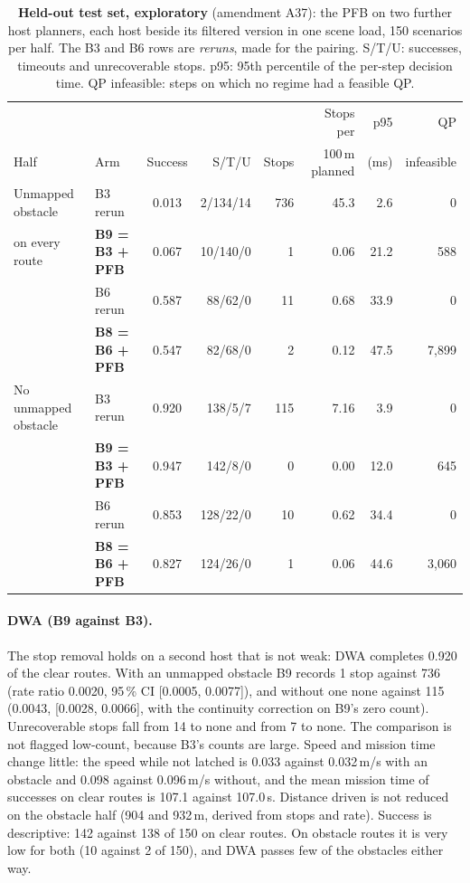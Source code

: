 \documentclass[11pt]{article}
\theoremstyle{definition}
\begin{document}
\begin{table}[!htbp]
\centering
\caption{\textbf{Held-out test set, exploratory} (amendment A37): the PFB on two further host planners, each host beside its
filtered version in one scene load, 150 scenarios per half. The B3 and B6 rows are \emph{reruns}, made for the pairing. S/T/U:
successes, timeouts and unrecoverable stops. p95: 95th percentile of the per-step decision time. QP infeasible: steps on
which no regime had a feasible QP.}
\label{tab:hosts}
\footnotesize
\setlength{\tabcolsep}{4pt}
\begin{tabular}{llcrrrrr}
\toprule
& & & & & Stops per & p95 & QP\\
Half & Arm & Success & S/T/U & Stops & 100\,m planned & (ms) & infeasible\\
\midrule
Unmapped obstacle & B3 rerun & 0.013 & 2/134/14 & 736 & 45.3 & 2.6 & 0\\
on every route & \textbf{B9 = B3 + PFB} & 0.067 & 10/140/0 & 1 & 0.06 & 21.2 & 588\\
& B6 rerun & 0.587 & 88/62/0 & 11 & 0.68 & 33.9 & 0\\
& \textbf{B8 = B6 + PFB} & 0.547 & 82/68/0 & 2 & 0.12 & 47.5 & 7{,}899\\
\midrule
No unmapped obstacle & B3 rerun & 0.920 & 138/5/7 & 115 & 7.16 & 3.9 & 0\\
& \textbf{B9 = B3 + PFB} & 0.947 & 142/8/0 & 0 & 0.00 & 12.0 & 645\\
& B6 rerun & 0.853 & 128/22/0 & 10 & 0.62 & 34.4 & 0\\
& \textbf{B8 = B6 + PFB} & 0.827 & 124/26/0 & 1 & 0.06 & 44.6 & 3{,}060\\
\bottomrule
\end{tabular}
\end{table}

\paragraph{DWA (B9 against B3).} The stop removal holds on a second host that is not weak: DWA completes 0.920 of the clear
routes. With an unmapped obstacle B9 records 1 stop against 736 (rate ratio 0.0020, 95\,\% CI [0.0005, 0.0077]), and without
one none against 115 (0.0043, [0.0028, 0.0066], with the continuity correction on B9's zero count). Unrecoverable stops fall
from 14 to none and from 7 to none. The comparison is not flagged low-count, because B3's counts are large. Speed and mission
time change little: the speed while not latched is 0.033 against 0.032\,m/s with an obstacle and 0.098 against 0.096\,m/s
without, and the mean mission time of successes on clear routes is 107.1 against 107.0\,s. Distance driven is not reduced
on the obstacle half (904 and 932\,m, derived from stops and rate). Success is descriptive: 142 against 138 of 150 on clear
routes. On obstacle routes it is very low for both (10 against 2 of 150), and DWA passes few of the obstacles either way.
\end{document}

